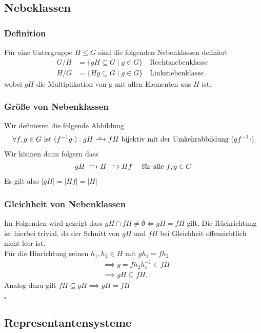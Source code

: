 \documentclass[12pt, german]{article}
\newcommand\iso{\xrightarrow{
		\,\smash{\raisebox{-0.65ex}{\ensuremath{\scriptstyle\sim}}}\,}}
\newcommand{\bewiesen}{

\begin{flushright}
		$\square$  \\
\end{flushright}}
\begin{document}
\subsection{Nebeklassen}
\subsubsection{Definition}
		Für eine Untergruppe $H \leq G$ sind die folgenden Nebenklassen definiert
		\begin{align*}
			 G/H &= \{gH \subseteq G \mid g \in G\} \quad \text{Rechtsnebenklasse } \\
			 H/G &= \{Hg \subseteq G \mid g \in G\} \quad \text{Linksnebenklasse } 
		\end{align*}
		wobei $gH$ die Multiplikation von  g mit allen Elementen aus $H$ ist. 

\subsubsection{Größe von Nebenklassen}
		Wir definieren die folgende Abbildung
		\begin{align*}
			\forall f,g \in G \text{ ist } (f^{-1}g \cdot): gH \iso fH \text{ bijektiv mit der Umkehrabbildung } (gf^{-1}\cdot)
		\end{align*}
		Wir können dann folgern dass 
		\begin{align*}
			gH \iso H \iso Hf \quad \text{ für alle } f,g \in G
		\end{align*}
		Es gilt also $|gH| = |Hf| = |H|$

\subsubsection{Gleichheit von Nebenklassen}
		Im Folgenden wird gezeigt dass $gH \cap fH \not = \emptyset \iff gH = fH$ gilt.
		Die Rückrichtung ist hierbei trivial, da der Schnitt von $gH$ und $fH$ bei Gleichheit offensichtlich nicht leer ist. \\
		
		Für die Hinrichtung seinen $h_1, h_2 \in H$ mit $gh_1 = fh_2$
		\begin{align*}
			&\implies g=fh_2h_1^{-1} \in fH \\
			&\implies gH \subseteq fH. 
		\end{align*}
		Analog dazu gilt $fH \subseteq gH \implies gH = fH$
		\bewiesen

\subsection{Representantensysteme}		
\end{document}
